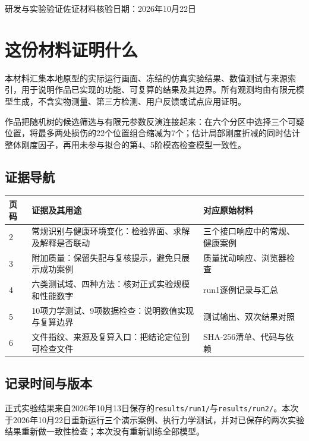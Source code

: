 \documentclass[UTF8,a4paper,11pt,fontset=fandol]{ctexart}
\newcommand{\file}[1]{{\small\nolinkurl{#1}}}
\begin{document}
{\noindent\small\color{accent}研发与实验验证佐证材料\hfill 核验日期：2026年10月22日}\par
{}\par
{}\par
\vspace{5mm}{\color{accent}\hrule}\vspace{6mm}
\section*{这份材料证明什么}
本材料汇集本地原型的实际运行画面、冻结的仿真实验结果、数值测试与来源索引，用于说明作品已实现的功能、可复算的结果及其边界。所有观测均由有限元模型生成，不含实物测量、第三方检测、用户反馈或试点应用证明。

作品把随机树的候选筛选与有限元参数反演连接起来：在六个分区中选择三个可疑位置，将最多两处损伤的22个位置组合缩减为7个；估计局部刚度折减的同时估计整体刚度因子，再用未参与拟合的第4、5阶模态检查模型一致性。
\subsection*{证据导航}
\par\noindent\begin{tabularx}{\linewidth}{@{}p{12mm}Xp{48mm}@{}}\toprule
页码 & 证据及其用途 & 对应原始材料\\\midrule
2 & 常规识别与健康环境变化：检验界面、求解及解释是否联动 & 三个接口响应中的常规、健康案例\\
3 & 附加质量：保留失配与复核提示，避免只展示成功案例 & 质量扰动响应、浏览器检查\\
4 & 六类测试域、四种方法：核对正式实验规模和性能数字 & run1逐例记录与汇总\\
5 & 10项力学测试、9项数据检查：说明数值实现与复算边界 & 测试输出、双次结果对照\\
6 & 文件指纹、来源及复算入口：把结论定位到可检查文件 & SHA-256清单、代码与依赖\\\bottomrule
\end{tabularx}
\subsection*{记录时间与版本}
正式实验结果来自2026年10月13日保存的\file{results/run1/}与\file{results/run2/}。本次于2026年10月22日重新运行三个演示案例、执行力学测试，并对已保存的两次实验结果重新做一致性检查；本次没有重新训练全部模型。
\end{document}

